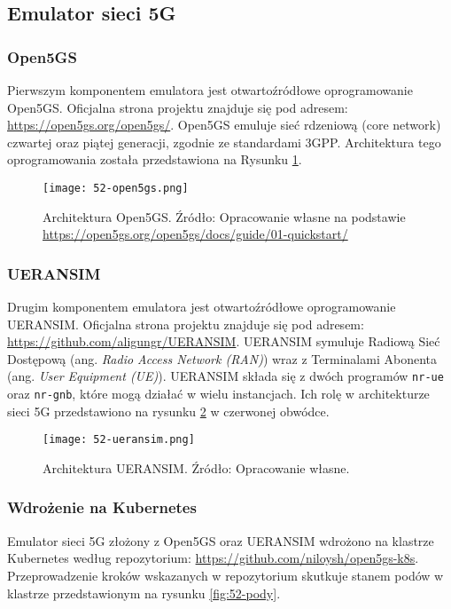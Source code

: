 \subsection{Emulator sieci 5G}

\subsubsection{Open5GS}

Pierwszym komponentem emulatora jest otwartoźródłowe oprogramowanie Open5GS. Oficjalna strona projektu znajduje się pod adresem: \url{https://open5gs.org/open5gs/}. Open5GS emuluje sieć rdzeniową (core network) czwartej oraz piątej generacji, zgodnie ze standardami 3GPP. Architektura tego oprogramowania została przedstawiona na Rysunku \ref{fig:52-open5gs}.

\begin{figure}[!h]
    \centering \texttt{[image: 52-open5gs.png]}
    \caption{Architektura Open5GS. Źródło: Opracowanie własne na podstawie \url{https://open5gs.org/open5gs/docs/guide/01-quickstart/}}\label{fig:52-open5gs}
\end{figure}

\subsubsection{UERANSIM}

Drugim komponentem emulatora jest otwartoźródłowe oprogramowanie UERANSIM. Oficjalna strona projektu znajduje się pod adresem: \url{https://github.com/aligungr/UERANSIM}. UERANSIM symuluje Radiową Sieć Dostępową (ang. \textit{Radio Access Network (RAN)}) wraz z Terminalami Abonenta (ang. \textit{User Equipment (UE)}). UERANSIM składa się z dwóch programów \texttt{nr-ue} oraz \texttt{nr-gnb}, które mogą działać w wielu instancjach. Ich rolę w architekturze sieci 5G przedstawiono na rysunku \ref{fig:52-ueransim} w czerwonej obwódce.

\begin{figure}[!h]
    \centering \texttt{[image: 52-ueransim.png]}
    \caption{Architektura UERANSIM. Źródło: Opracowanie własne.}\label{fig:52-ueransim}
\end{figure}

\subsubsection{Wdrożenie na Kubernetes}

Emulator sieci 5G złożony z Open5GS oraz UERANSIM wdrożono na klastrze Kubernetes według repozytorium: \url{https://github.com/niloysh/open5gs-k8s}. Przeprowadzenie kroków wskazanych w repozytorium skutkuje stanem podów w klastrze przedstawionym na rysunku \ref{fig:52-pody}.


